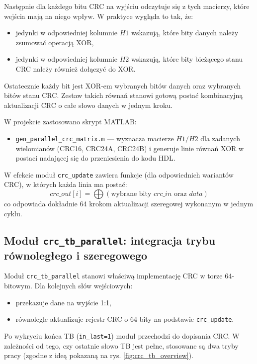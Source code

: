 Następnie dla każdego bitu CRC na wyjściu odczytuje się z tych macierzy, które wejścia mają na niego wpływ. W praktyce wygląda to tak, że:
\begin{itemize}
  \item jedynki w odpowiedniej kolumnie $H1$ wskazują, które bity danych należy zsumować operacją XOR,
  \item jedynki w odpowiedniej kolumnie $H2$ wskazują, które bity bieżącego stanu CRC należy również dołączyć do XOR.
\end{itemize}

Ostatecznie każdy bit jest XOR-em wybranych bitów danych oraz wybranych bitów stanu CRC. Zestaw takich równań stanowi gotową postać kombinacyjną aktualizacji CRC o całe słowo danych w jednym kroku.



W projekcie zastosowano skrypt MATLAB:
\begin{itemize}
    \item \texttt{gen\_parallel\_crc\_matrix.m} --- wyznacza macierze $H1/H2$ dla zadanych wielomianów (CRC16, CRC24A, CRC24B) i generuje linie równań XOR w postaci nadającej się do przeniesienia do kodu HDL.
\end{itemize}

W efekcie moduł \texttt{crc\_update} zawiera funkcje (dla odpowiednich wariantów CRC), w których każda linia ma postać:
\[
crc\_out[i] = \bigoplus(\text{wybrane bity } crc\_in \text{ oraz } data)
\]
co odpowiada dokładnie 64 krokom aktualizacji szeregowej wykonanym w jednym cyklu.


\subsection{Moduł \texttt{crc\_tb\_parallel}: integracja trybu równoległego i szeregowego}
\label{subsec:crc_tb_parallel}

Moduł \texttt{crc\_tb\_parallel} stanowi właściwą implementację CRC w torze 64-bitowym. Dla kolejnych słów wejściowych:
\begin{itemize}
    \item przekazuje dane na wyjście 1:1,
    \item równolegle aktualizuje rejestr CRC o 64 bity na podstawie \texttt{crc\_update}.
\end{itemize}

Po wykryciu końca TB (\texttt{in\_last=1}) moduł przechodzi do dopisania CRC. W zależności od tego, czy ostatnie słowo TB jest pełne, stosowane są dwa tryby pracy (zgodne z ideą pokazaną na rys. \ref{fig:crc_tb_overview}).

